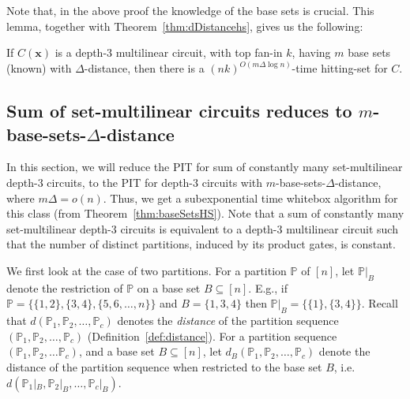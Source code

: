 \documentclass[final,oneeqnum, onethmnum, onefignum]{siamltex1213}
\renewcommand{\P}{\mathbb P}
\newcommand{\di}{\Delta} %
\begin{document}
Note that, in the above proof the knowledge of the base sets is crucial.
This lemma, together with Theorem~\ref{thm:dDistancehs}, gives us the following:

\begin{theorem}[$m$-base-sets-$\di$-distance PIT]
\label{thm:baseSetsHS}
If $C(\mathbf{x})$ is a depth-$3$ multilinear circuit, 
with top fan-in $k$, 
having $m$ base sets (known) with $\di$-distance, 
then there is a $(nk)^{O(m \di \log n)}$-time hitting-set for $C$. 
\end{theorem}

\subsection{Sum of set-multilinear circuits reduces to $m$-base-sets-$\di$-distance}
\label{sec:sumSetMult}
In this section, we will reduce the PIT for 
sum of constantly many set-multilinear depth-$3$ circuits, 
to the PIT for depth-$3$ circuits with 
$m$-base-sets-$\di$-distance, where $m \di = o(n)$. 
Thus, we get a subexponential time whitebox algorithm 
for this class (from Theorem~\ref{thm:baseSetsHS}). 
Note that a sum of constantly many set-multilinear depth-$3$ circuits
is equivalent to a depth-$3$ multilinear circuit such that 
the number of distinct partitions, induced by its product gates,
is constant.

We first look at the case of two partitions. 
For a partition $\P$ of $[n]$, 
let $\P|_B$ denote the restriction of $\P$ on a base set
$B \subseteq [n]$. 
E.g., if $\P = \{ \{1,2\}, \{3,4\}, \{5,6, \dots, n\}\}$ and $B = \{1,3,4\}$
then $\P|_B = \{ \{1\}, \{3,4\} \}$.
Recall that $d(\P_1,\P_2, \dots, \P_c)$ denotes the {\em distance}
of the partition sequence $(\P_1,\P_2, \dots, \P_c)$ (Definition~\ref{def:distance}).  
For a partition sequence $(\P_1, \P_2, \dots \P_c)$, 
and a base set $B \subseteq [n]$, 
let $d_B(\P_1, \P_2, \dots, \P_c)$ denote the distance of the partition sequence
when restricted to the base set $B$, i.e.\
$d(\P_1|_B, \P_2|_B, \dots, \P_c|_B)$.
\end{document}
